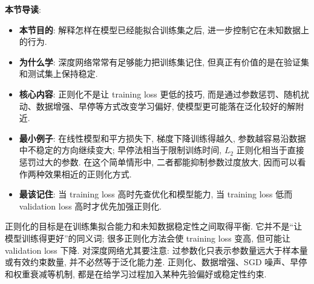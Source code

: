 \documentclass{../nndlcourse}
\begin{document}
\textbf{本节导读}:
\begin{itemize}
  \item \textbf{本节目的}: 解释怎样在模型已经能拟合训练集之后, 进一步控制它在未知数据上的行为.
  \item \textbf{为什么学}: 深度网络常常有足够能力把训练集记住, 但真正有价值的是在验证集和测试集上保持稳定.
  \item \textbf{核心内容}: 正则化不是让 training loss 更低的技巧, 而是通过参数惩罚、随机扰动、数据增强、早停等方式改变学习偏好, 使模型更可能落在泛化较好的解附近.
  \item \textbf{最小例子}: 在线性模型和平方损失下, 梯度下降训练得越久, 参数越容易沿数据中不稳定的方向继续变大; 早停法相当于限制训练时间, $L_2$ 正则化相当于直接惩罚过大的参数. 在这个简单情形中, 二者都能抑制参数过度放大, 因而可以看作两种效果相近的正则化方式.
  \item \textbf{最该记住}: 当 training loss 高时先查优化和模型能力, 当 training loss 低而 validation loss 高时才优先加强正则化.
\end{itemize}

正则化的目标是在训练集拟合能力和未知数据稳定性之间取得平衡. 它并不是“让模型训练得更好”的同义词; 很多正则化方法会使 training loss 变高, 但可能让 validation loss 下降. 对深度网络尤其要注意: 过参数化只表示参数量远大于样本量或有效约束数量, 并不必然等于泛化能力差. 正则化、数据增强、SGD 噪声、早停和权重衰减等机制, 都是在给学习过程加入某种先验偏好或稳定性约束.
\end{document}
